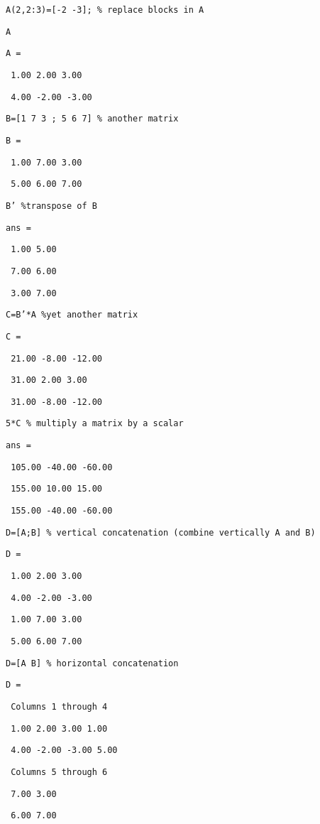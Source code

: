 \documentclass[12pt,a4paper]{article}
\begin{document}
\texttt{A(2,2:3)=[-2 -3]; \% replace blocks in A}

\texttt{A}

\texttt{A =}

\texttt{\ 1.00 2.00 3.00}

\texttt{\ 4.00 -2.00 -3.00}

\texttt{B=[1 7 3 ; 5 6 7] \% another matrix}

\texttt{B =}

\texttt{\ 1.00 7.00 3.00}

\texttt{\ 5.00 6.00 7.00}

\texttt{B' \%transpose of B}

\texttt{ans =}

\texttt{\ 1.00 5.00}

\texttt{\ 7.00 6.00}

\texttt{\ 3.00 7.00}

\texttt{C=B'*A \%yet another matrix}

\texttt{C =}

\texttt{\ 21.00 -8.00 -12.00}

\texttt{\ 31.00 2.00 3.00}

\texttt{\ 31.00 -8.00 -12.00}

\texttt{5*C \% multiply a matrix by a scalar}

\texttt{ans =}

\texttt{\ 105.00 -40.00 -60.00}

\texttt{\ 155.00 10.00 15.00}

\texttt{\ 155.00 -40.00 -60.00}

\texttt{D=[A;B] \% vertical concatenation (combine vertically A and B)}

\texttt{D =}

\texttt{\ 1.00 2.00 3.00}

\texttt{\ 4.00 -2.00 -3.00}

\texttt{\ 1.00 7.00 3.00}

\texttt{\ 5.00 6.00 7.00}

\texttt{D=[A B] \% horizontal concatenation}

\texttt{D =}

\texttt{\ Columns 1 through 4 }

\texttt{\ 1.00 2.00 3.00 1.00}

\texttt{\ 4.00 -2.00 -3.00 5.00}

\texttt{\ Columns 5 through 6 }

\texttt{\ 7.00 3.00}

\texttt{\ 6.00 7.00}
\end{document}

